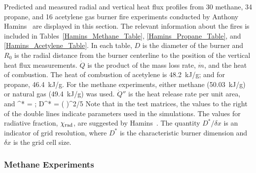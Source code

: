 Predicted and measured radial and vertical heat flux profiles from 30 methane, 34 propane, and 16 acetylene gas burner fire experiments conducted by Anthony Hamins~\cite{Hamins:TN2016} are displayed in this section. The relevant information about the fires is included in Tables~\ref{Hamins_Methane_Table}, \ref{Hamins_Propane_Table}, and \ref{Hamins_Acetylene_Table}. In each table, $D$ is the diameter of the burner and $R_0$ is the radial distance from the burner centerline to the position of the vertical heat flux measurements. $\dot{Q}$ is the product of the mass loss rate, $\dot{m}$, and the heat of combustion. The heat of combustion of acetylene is 48.2~kJ/g; and for propane, 46.4~kJ/g. For the methane experiments, either methane (50.03~kJ/g) or natural gas (49.4~kJ/g) was used. $\dot{Q}''$ is the heat release rate per unit area, and
\be
   ^* =    \quad ; \quad    D^* = \left(  \right)^{2/5}
\ee
Note that in the test matrices, the values to the right of the double lines indicate parameters used in the simulations.  The values for radiative fraction, $\chi_{\rm rad}$, are suggested by Hamins~\cite{Hamins:TN2016}. The quantity $D^*/\delta x$ is an indicator of grid resolution, where $D^*$ is the characteristic burner dimension and $\delta x$ is the grid cell size.

\newpage

\subsubsection{Methane Experiments}

